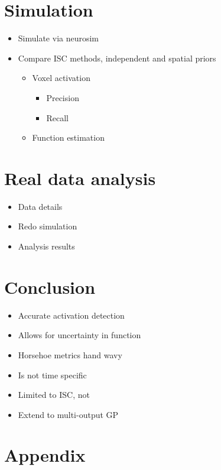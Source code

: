 \section{Simulation}
\begin{itemize}
  \item Simulate via neurosim
  \item Compare ISC methods, independent and spatial priors
  \begin{itemize}
    \item Voxel activation
    \begin{itemize}
      \item Precision
      \item Recall
    \end{itemize}
    \item Function estimation
  \end{itemize}
\end{itemize}

\section{Real data analysis}
\begin{itemize}
  \item Data details
  \item Redo simulation
  \item Analysis results
\end{itemize}

\section{Conclusion}
\begin{itemize}
  \item Accurate activation detection
  \item Allows for uncertainty in function
  \item Horsehoe metrics hand wavy
  \item Is not time specific
  \item Limited to ISC, not 
  \item Extend to multi-output GP
\end{itemize}

\section{Appendix}




